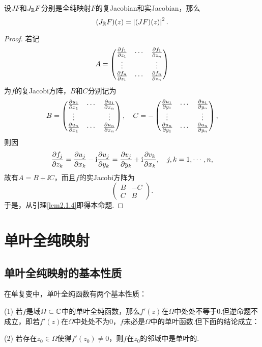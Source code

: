 \begin{prop}\label{prop2.1.5}
	设$JF$和$J_\mathbb R F$分别是全纯映射$F$的复Jacobian和实Jacobian，那么
	\[(J_\mathbb R F)(z)=\left|(J F)(z)\right|^2.\]
\end{prop}
\begin{proof}
	若记
	\[A=\begin{pmatrix}
		\frac{\partial f_1}{\partial z_1} & \cdots & \frac{\partial f_1}{\partial z_n}\\
		\vdots  & & \vdots \\
		\frac{\partial f_n}{\partial z_1} & \cdots &\frac{\partial f_n}{\partial z_n}
	\end{pmatrix}\]
为$f$的复Jacobi方阵，$B$和$C$分别记为
\[B=\begin{pmatrix}
	\frac{\partial u_1}{\partial x_1} & \cdots & \frac{\partial u_1}{\partial x_n}\\
	\vdots &  & \vdots\\
	\frac{\partial u_n}{\partial x_1}  &\cdots & \frac{\partial u_n}{\partial x_n}
\end{pmatrix},\quad C=-\begin{pmatrix}
\frac{\partial u_1}{\partial y_1} & \cdots & \frac{\partial u_1}{\partial y_n}\\
\vdots &  & \vdots\\
\frac{\partial u_n}{\partial y_1}  &\cdots & \frac{\partial u_n}{\partial y_n}
\end{pmatrix},\]
则因
\[\frac{\partial f_j}{\partial z_k}=\frac{\partial u_j}{\partial x_k}-\mathrm i\frac{\partial u_j}{\partial y_k}=\frac{\partial v_j}{\partial y_k}+\mathrm i\frac{\partial v_k}{\partial x_k},\quad j,k=1,\cdots,n,\]
故有\quad $A=B+\ii C$，而且$f$的实Jacobi方阵为
\[\begin{pmatrix}
	B & -C\\
	C &  B
\end{pmatrix}.\]
于是，从引理\ref{lem2.1.4}即得本命题.
\end{proof}
\section{单叶全纯映射\label{sec2.2}}
\subsection{单叶全纯映射的基本性质}
在单复变中，单叶全纯函数有两个基本性质：

(1)\hypertarget{2.2.1}{}
若$f$是域$\varOmega\subset\mathbb C$中的单叶全纯函数，那么$f'(z)$在$\Omega$中处处不等于$0$.但逆命题不成立，即若$f'(z)$在$\Omega$中处处不为$0$，$f$未必是$\Omega$中的单叶函数.但下面的结论成立：

(2)\hypertarget{2.2.1}{}
若存在$z_0\in\Omega$使得$f'(z_0)\neq0$，则$f$在$z_0$的邻域中是单叶的.

